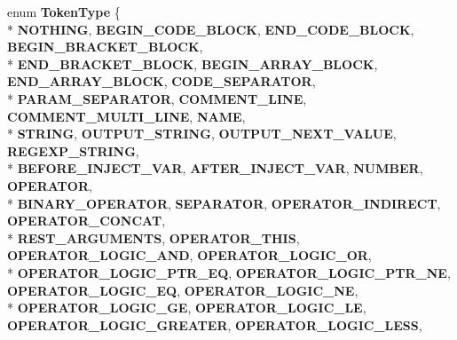 \begin{DoxyCompactItemize}
\item 
enum {\bfseries Token\+Type} \{ \\*
{\bfseries N\+O\+T\+H\+I\+NG}, 
{\bfseries B\+E\+G\+I\+N\+\_\+\+C\+O\+D\+E\+\_\+\+B\+L\+O\+CK}, 
{\bfseries E\+N\+D\+\_\+\+C\+O\+D\+E\+\_\+\+B\+L\+O\+CK}, 
{\bfseries B\+E\+G\+I\+N\+\_\+\+B\+R\+A\+C\+K\+E\+T\+\_\+\+B\+L\+O\+CK}, 
\\*
{\bfseries E\+N\+D\+\_\+\+B\+R\+A\+C\+K\+E\+T\+\_\+\+B\+L\+O\+CK}, 
{\bfseries B\+E\+G\+I\+N\+\_\+\+A\+R\+R\+A\+Y\+\_\+\+B\+L\+O\+CK}, 
{\bfseries E\+N\+D\+\_\+\+A\+R\+R\+A\+Y\+\_\+\+B\+L\+O\+CK}, 
{\bfseries C\+O\+D\+E\+\_\+\+S\+E\+P\+A\+R\+A\+T\+OR}, 
\\*
{\bfseries P\+A\+R\+A\+M\+\_\+\+S\+E\+P\+A\+R\+A\+T\+OR}, 
{\bfseries C\+O\+M\+M\+E\+N\+T\+\_\+\+L\+I\+NE}, 
{\bfseries C\+O\+M\+M\+E\+N\+T\+\_\+\+M\+U\+L\+T\+I\+\_\+\+L\+I\+NE}, 
{\bfseries N\+A\+ME}, 
\\*
{\bfseries S\+T\+R\+I\+NG}, 
{\bfseries O\+U\+T\+P\+U\+T\+\_\+\+S\+T\+R\+I\+NG}, 
{\bfseries O\+U\+T\+P\+U\+T\+\_\+\+N\+E\+X\+T\+\_\+\+V\+A\+L\+UE}, 
{\bfseries R\+E\+G\+E\+X\+P\+\_\+\+S\+T\+R\+I\+NG}, 
\\*
{\bfseries B\+E\+F\+O\+R\+E\+\_\+\+I\+N\+J\+E\+C\+T\+\_\+\+V\+AR}, 
{\bfseries A\+F\+T\+E\+R\+\_\+\+I\+N\+J\+E\+C\+T\+\_\+\+V\+AR}, 
{\bfseries N\+U\+M\+B\+ER}, 
{\bfseries O\+P\+E\+R\+A\+T\+OR}, 
\\*
{\bfseries B\+I\+N\+A\+R\+Y\+\_\+\+O\+P\+E\+R\+A\+T\+OR}, 
{\bfseries S\+E\+P\+A\+R\+A\+T\+OR}, 
{\bfseries O\+P\+E\+R\+A\+T\+O\+R\+\_\+\+I\+N\+D\+I\+R\+E\+CT}, 
{\bfseries O\+P\+E\+R\+A\+T\+O\+R\+\_\+\+C\+O\+N\+C\+AT}, 
\\*
{\bfseries R\+E\+S\+T\+\_\+\+A\+R\+G\+U\+M\+E\+N\+TS}, 
{\bfseries O\+P\+E\+R\+A\+T\+O\+R\+\_\+\+T\+H\+IS}, 
{\bfseries O\+P\+E\+R\+A\+T\+O\+R\+\_\+\+L\+O\+G\+I\+C\+\_\+\+A\+ND}, 
{\bfseries O\+P\+E\+R\+A\+T\+O\+R\+\_\+\+L\+O\+G\+I\+C\+\_\+\+OR}, 
\\*
{\bfseries O\+P\+E\+R\+A\+T\+O\+R\+\_\+\+L\+O\+G\+I\+C\+\_\+\+P\+T\+R\+\_\+\+EQ}, 
{\bfseries O\+P\+E\+R\+A\+T\+O\+R\+\_\+\+L\+O\+G\+I\+C\+\_\+\+P\+T\+R\+\_\+\+NE}, 
{\bfseries O\+P\+E\+R\+A\+T\+O\+R\+\_\+\+L\+O\+G\+I\+C\+\_\+\+EQ}, 
{\bfseries O\+P\+E\+R\+A\+T\+O\+R\+\_\+\+L\+O\+G\+I\+C\+\_\+\+NE}, 
\\*
{\bfseries O\+P\+E\+R\+A\+T\+O\+R\+\_\+\+L\+O\+G\+I\+C\+\_\+\+GE}, 
{\bfseries O\+P\+E\+R\+A\+T\+O\+R\+\_\+\+L\+O\+G\+I\+C\+\_\+\+LE}, 
{\bfseries O\+P\+E\+R\+A\+T\+O\+R\+\_\+\+L\+O\+G\+I\+C\+\_\+\+G\+R\+E\+A\+T\+ER}, 
{\bfseries O\+P\+E\+R\+A\+T\+O\+R\+\_\+\+L\+O\+G\+I\+C\+\_\+\+L\+E\+SS}, 

\end{DoxyCompactItemize}

